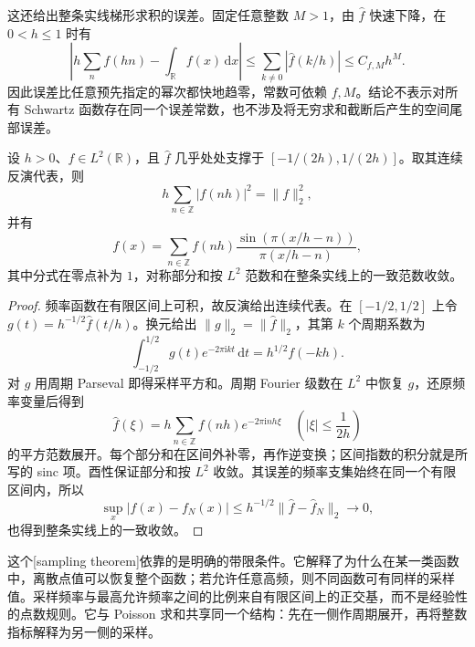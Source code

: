 这还给出整条实线梯形求积的误差。固定任意整数 \(M>1\)，由 \(\widehat f\) 快速下降，在 \(0<h\leq1\) 时有
\[
 \left|h\sum_nf(hn)-\int_{\mathbb R}f(x)\,\mathrm{d}x\right|
 \leq\sum_{k\ne0}|\widehat f(k/h)|\leq C_{f,M}h^M.
\]
因此误差比任意预先指定的幂次都快地趋零，常数可依赖 \(f,M\)。结论不表示对所有 Schwartz 函数存在同一个误差常数，也不涉及将无穷求和截断后产生的空间尾部误差。



\begin{theorem}[带限采样]\label{b2:thm:06-sampling}
设 \(h>0\)、\(f\in L^2(\mathbb R)\)，且 \(\widehat f\) 几乎处处支撑于 \([-1/(2h),1/(2h)]\)。取其连续反演代表，则
\[
 h\sum_{n\in\mathbb Z}|f(nh)|^2=\|f\|_2^2,
\]
并有
\[
 f(x)=\sum_{n\in\mathbb Z}f(nh)
 \dfrac{\sin(\pi(x/h-n))}{\pi(x/h-n)},
\]
其中分式在零点补为 \(1\)，对称部分和按 \(L^2\) 范数和在整条实线上的一致范数收敛。
\end{theorem}
\begin{proof}
频率函数在有限区间上可积，故反演给出连续代表。在 \([-1/2,1/2]\) 上令 \(g(t)=h^{-1/2}\widehat f(t/h)\)。换元给出 \(\|g\|_2=\|\widehat f\|_2\)，其第 \(k\) 个周期系数为
\[
 \int_{-1/2}^{1/2}g(t)e^{-2\pi\mathrm{i}kt}\,\mathrm{d}t
 =h^{1/2}f(-kh).
\]
对 \(g\) 用周期 Parseval 即得采样平方和。周期 Fourier 级数在 \(L^2\) 中恢复 \(g\)，还原频率变量后得到
\[
 \widehat f(\xi)=h\sum_{n\in\mathbb Z}f(nh)e^{-2\pi\mathrm{i}nh\xi}
 \quad\left(|\xi|\leq\dfrac1{2h}\right)
\]
的平方范数展开。每个部分和在区间外补零，再作逆变换；区间指数的积分就是所写的 sinc 项。酉性保证部分和按 \(L^2\) 收敛。其误差的频率支集始终在同一个有限区间内，所以
\[
 \sup_x|f(x)-f_N(x)|
 \leq h^{-1/2}\|\widehat f-\widehat f_N\|_2\longrightarrow0,
\]
也得到整条实线上的一致收敛。
\end{proof}

这个[sampling theorem]依靠的是明确的带限条件。它解释了为什么在某一类函数中，离散点值可以恢复整个函数；若允许任意高频，则不同函数可有同样的采样值。采样频率与最高允许频率之间的比例来自有限区间上的正交基，而不是经验性的点数规则。它与 Poisson 求和共享同一个结构：先在一侧作周期展开，再将整数指标解释为另一侧的采样。
